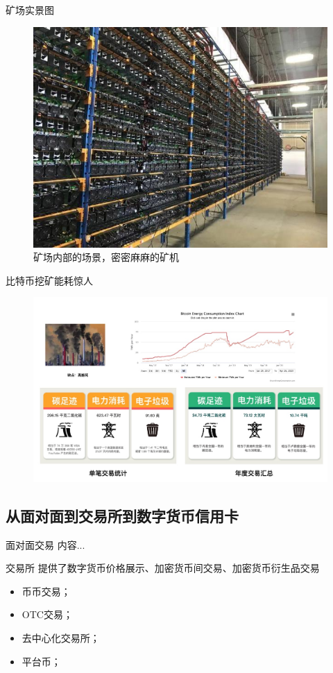 \documentclass[11pt]{beamer}
\begin{document}
\begin{frame}{矿场实景图}
	\begin{figure}
	\centering
	\includegraphics[width=0.7\linewidth]{figures/miningFactory}
	\caption{矿场内部的场景，密密麻麻的矿机}
	\label{fig:miningfactory}
	\end{figure}
\end{frame}

\begin{frame}{比特币挖矿能耗惊人}
	\begin{figure}
		\centering
		\includegraphics[width=0.88\linewidth]{figures/powerWastedOfBTCjpg}
		\label{fig:powerwastedofbtcjpg}
	\end{figure}
	
\end{frame}
\subsection{从面对面到交易所到数字货币信用卡}
\begin{frame}{面对面交易}
	内容...
\end{frame}

\begin{frame}{交易所}
	提供了数字货币价格展示、加密货币间交易、加密货币衍生品交易
	\begin{itemize}
		\item 币币交易；
		\item OTC交易；
		\item 去中心化交易所；
		\item 平台币；
	\end{itemize}
\end{frame}
\end{document}

